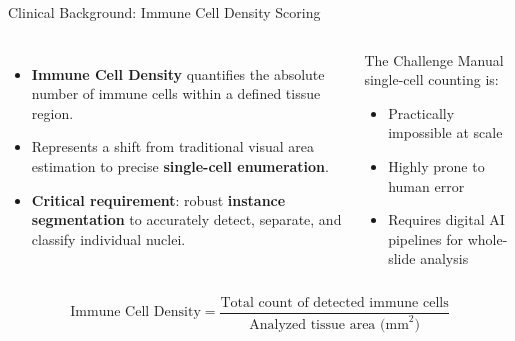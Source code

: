 \documentclass[aspectratio=169, 10pt]{beamer}
\begin{document}
\begin{frame}{Clinical Background: Immune Cell Density Scoring}
  \begin{columns}
    \begin{itemize}
      \item \textbf{Immune Cell Density} quantifies the absolute number of immune cells within a defined tissue region.
      \item Represents a shift from traditional visual area estimation to precise \textbf{single-cell enumeration}.
      \item \textbf{Critical requirement}: robust \textbf{instance segmentation} to accurately detect, separate, and classify individual nuclei.
    \end{itemize}

    \begin{alertblock}{The Challenge}
      Manual single-cell counting is:
      \begin{itemize}
        \item Practically impossible at scale
        \item Highly prone to human error
        \item Requires digital AI pipelines for whole-slide analysis
      \end{itemize}
    \end{alertblock}
  \end{columns}

  \vspace{3em}

  \begin{equation*}
      \text{Immune Cell Density} = \frac{\text{Total count of detected immune cells}}{\text{Analyzed tissue area (mm}^2\text{)}}
  \end{equation*}
\end{frame}
\end{document}
